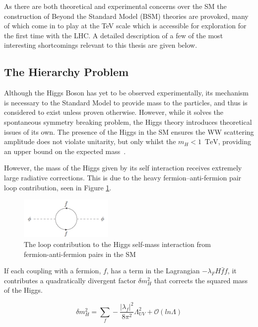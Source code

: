 As there are both theoretical and experimental concerns over the SM the construction of Beyond the Standard Model (BSM) theories are provoked, many of which come in to play at the TeV scale which is accessible for exploration for the first time with the LHC. A detailed description of a few of the most interesting shortcomings relevant to this thesis are given below.

\subsection{The Hierarchy Problem}
Although the Higgs Boson has yet to be observed experimentally, its mechanism is necessary to the Standard Model to provide mass to the particles, and thus is considered to exist unless proven otherwise. However, while it solves the spontaneous symmetry breaking problem, the Higgs theory introduces theoretical issues of its own. The presence of the Higgs in the SM ensures the WW scattering amplitude does not violate unitarity, but only whilst the $m_{H} < 1$~$\textrm{TeV}$, providing an upper bound on the expected mass~\cite{WWHMass}. 

However, the mass of the Higgs given by its self interaction receives extremely large radiative corrections. This is due to the heavy fermion--anti-fermion pair loop contribution, seen in Figure \ref{fig:hiloop}. 

\begin{figure}
\centering
\includegraphics[width=0.4\textwidth]{Figures/Theory/higgsself}
\caption{\label{fig:hiloop}The loop contribution to the Higgs self-mass interaction from fermion-anti-fermion pairs in the SM}
\end{figure}

If each coupling with a fermion, $f$, has a term in the Lagrangian $-\lambda_{F} H \bar{f}f$, it contributes a quadratically divergent factor $\delta m^{2}_{H}$ that corrects the squared mass of the Higgs. 

\begin{equation}
\delta m^{2}_{H} =\sum_{f} - \frac{|\lambda_{f}|^{2}}{8 \pi^{2}}\Lambda^{2}_{UV} + \mathcal{O}(ln\Lambda)
\label{eqn:HIGGQUAD}
\end{equation}

